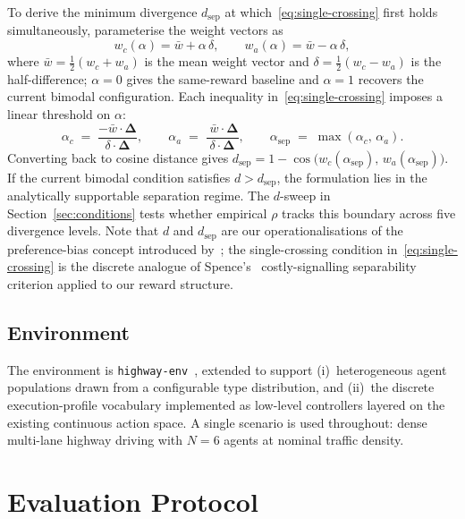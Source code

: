 \documentclass[12pt,a4paper]{article}
\begin{document}
To derive the minimum divergence $d_\text{sep}$ at which~\eqref{eq:single-crossing} first
holds simultaneously, parameterise the weight vectors as
\begin{equation}
    w_c(\alpha) = \bar{w} + \alpha\,\delta, \qquad
    w_a(\alpha) = \bar{w} - \alpha\,\delta,
    \label{eq:weight-param}
\end{equation}
where $\bar{w} = \tfrac{1}{2}(w_c + w_a)$ is the mean weight vector and
$\delta = \tfrac{1}{2}(w_c - w_a)$ is the half-difference; $\alpha = 0$ gives the
same-reward baseline and $\alpha = 1$ recovers the current bimodal configuration.
Each inequality in~\eqref{eq:single-crossing} imposes a linear threshold on $\alpha$:
\begin{equation}
    \alpha_c \;=\; \frac{-\bar{w} \cdot \boldsymbol{\Delta}}{\delta \cdot \boldsymbol{\Delta}},
    \qquad
    \alpha_a \;=\; \frac{\;\bar{w} \cdot \boldsymbol{\Delta}}{\delta \cdot \boldsymbol{\Delta}},
    \qquad
    \alpha_\text{sep} \;=\; \max(\alpha_c,\, \alpha_a).
    \label{eq:alpha-sep}
\end{equation}
Converting back to cosine distance gives
$d_\text{sep} = 1 - \cos\!\bigl(w_c(\alpha_\text{sep}),\, w_a(\alpha_\text{sep})\bigr)$.
If the current bimodal condition satisfies $d > d_\text{sep}$, the formulation lies in the
analytically supportable separation regime. The $d$-sweep in Section~\ref{sec:conditions} tests whether empirical $\rho$ tracks this
boundary across five divergence levels. Note that $d$ and $d_{\text{sep}}$ are our
operationalisations of the preference-bias concept introduced by~\citet{crawford1982strategic};
the single-crossing condition in~\eqref{eq:single-crossing} is the discrete analogue of
Spence's~\cite{spence1973job} costly-signalling separability criterion applied to our reward
structure.

\subsection{Environment}

The environment is \texttt{highway-env}~\cite{leurent2018environment}, extended to support
(i)~heterogeneous agent populations drawn from a configurable type distribution, and (ii)~the
discrete execution-profile vocabulary implemented as low-level controllers layered on the
existing continuous action space. A single scenario is used throughout: dense multi-lane highway
driving with $N = 6$ agents at nominal traffic density.

\section{Evaluation Protocol}
\label{sec:eval}
\end{document}
